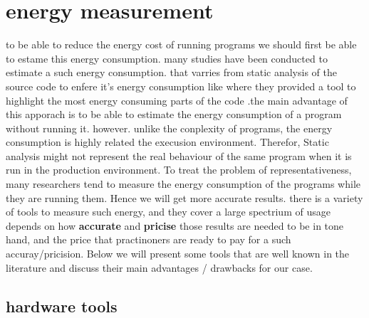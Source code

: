 \section{energy measurement}
to be able to reduce the energy cost of running programs we should first be able to estame this energy consumption.
many studies have been conducted to estimate a such energy consumption. that varries from static analysis of the source code to enfere it's energy consumption like \citeauthor{pereira_helping_2017} where they provided a tool to highlight the most energy consuming parts of the code \cite{pereira_helping_2017}.the main advantage of this apporach is to be able to estimate the energy consumption of a program without running it. however. unlike the conplexity of programs, the energy consumption is highly related the execusion environment. Therefor, Static analysis might not represent the real behaviour of the same program when it is run in the production environment.
To treat the problem of representativeness, many researchers tend to measure the energy consumption of the programs while they are running them. Hence we will get more accurate results.
there is a variety of tools to measure such energy, and they cover a large spectrium of usage depends on how \textbf{accurate} and \textbf{pricise} those results are needed to be in tone hand, and the price that practinoners are ready to pay for a such accuray/pricision.
Below we will present some tools that are well known in the literature and discuss their main advantages / drawbacks for our case.
\subsection{hardware tools}


